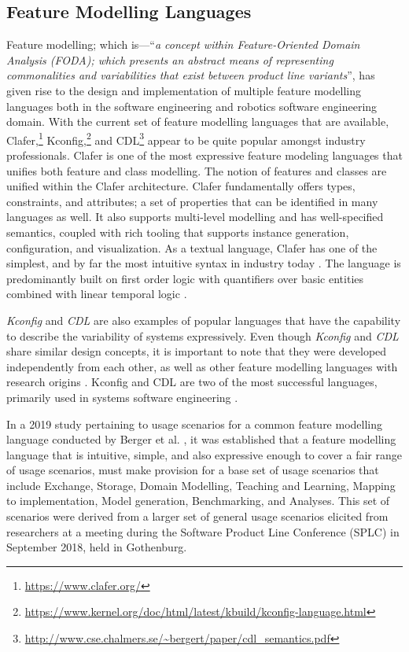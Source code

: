 \documentclass[conference]{IEEEtran}
\newcommand{\foot}[1]{\footnote{\url{#1}}}
\begin{document}
 \subsection{Feature Modelling Languages}
Feature modelling; which is---``{\em a concept within Feature-Oriented Domain Analysis (FODA)\cite{foda-tech-rep}; which presents an abstract means of representing commonalities and variabilities that exist between product line variants}'', has given rise to the design and implementation of multiple feature modelling languages both in the software engineering and robotics software engineering domain.
With the current set of feature modelling languages that
are available, Clafer,\foot{https://www.clafer.org/} Kconfig,\foot{https://www.kernel.org/doc/html/latest/kbuild/kconfig-language.html} and CDL\foot{http://www.cse.chalmers.se/~bergert/paper/cdl_semantics.pdf} appear to be quite popular amongst industry professionals. Clafer is one of the most expressive feature modeling languages that unifies both feature and class modelling. The notion of features and classes are unified within the Clafer architecture. Clafer fundamentally offers types, constraints, and attributes; a set of properties that can be identified in many languages as well. It also supports multi-level modelling and has well-specified semantics, coupled with rich tooling that supports instance generation, configuration, and visualization. As a textual language, Clafer has one of the simplest, and by far the most intuitive syntax in industry today \cite{fmod-lang-scenarios}. The language is predominantly built on first order logic with quantifiers over basic entities combined with linear temporal logic \cite{clafer}.

\textit{Kconfig} and \textit{CDL} are also examples of popular languages that have the capability to describe the variability of systems expressively. Even though \textit{Kconfig} and \textit{CDL} share similar design concepts, it is important to note that they were developed independently from each other, as well as other feature modelling languages with research origins \cite{vmir}. Kconfig and CDL are two of the most successful languages, primarily used in systems software engineering \cite{fmod-lang-scenarios}.

In a 2019 study pertaining to usage scenarios for a common feature modelling language conducted by Berger et al. \cite{fmod-lang-scenarios}, it was established that a feature modelling language that is intuitive, simple, and also expressive enough to cover a fair range of usage scenarios, must make provision for a base set of usage scenarios that include Exchange, Storage, Domain Modelling, Teaching and Learning, Mapping to implementation, Model generation, Benchmarking, and Analyses. This set of scenarios were derived from a larger set of general usage scenarios elicited from researchers at a meeting during the Software Product Line Conference (SPLC) in September 2018, held in Gothenburg.
\end{document}
